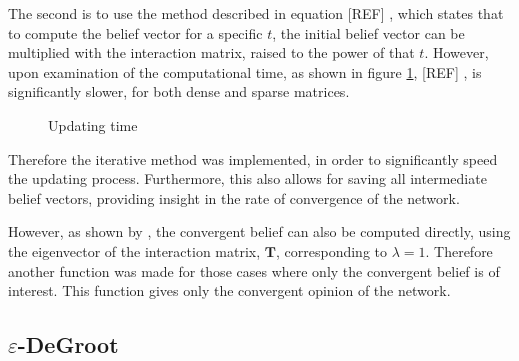 \documentclass{article}
\newcommand{\T}{\textbf{T}}
\begin{document}
The second is to use the method described in equation [REF] , which states that to compute the belief vector for a specific $t$, the initial belief vector can be multiplied with the interaction matrix, raised to the power of that $t$. However, upon examination of the computational time, as shown in figure \ref{update:time}, [REF] , is significantly slower, for both dense and sparse matrices.
\begin{figure}[!htbp]%
    \centering
    \qquad
    \caption{Updating time}%
    \label{update:time}%
\end{figure}

Therefore the iterative method was implemented, in order to significantly speed the updating process. Furthermore, this also allows for saving all intermediate belief vectors, providing insight in the rate of convergence of the network.

However, as shown by \cite{degroot1974concensus}, the convergent belief can also be computed directly, using the eigenvector of the interaction matrix, $\T$, corresponding to $\lambda=1$. Therefore another function was made for those cases where only the convergent belief is of interest. This function gives only the convergent opinion of the network.

\subsection{$\varepsilon$-DeGroot}
\end{document}
